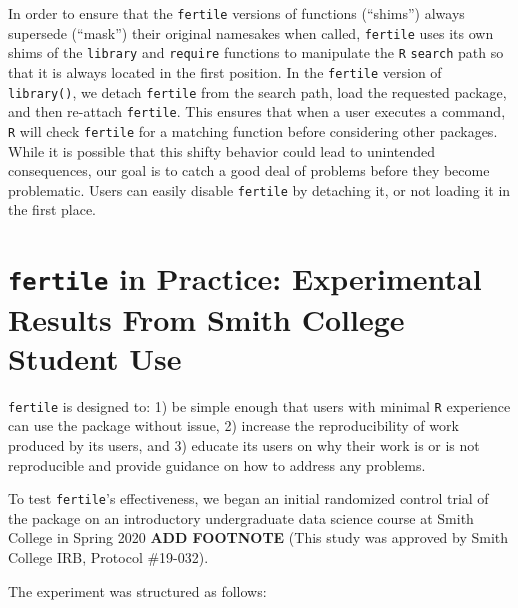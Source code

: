 \documentclass[12pt,twoside]{reedthesis}
\begin{document}
In order to ensure that the \texttt{fertile} versions of functions
(``shims'') always supersede (``mask'') their original namesakes when
called, \texttt{fertile} uses its own shims of the \texttt{library} and
\texttt{require} functions to manipulate the \texttt{R} \texttt{search}
path so that it is always located in the first position. In the
\texttt{fertile} version of \texttt{library()}, we detach
\texttt{fertile} from the search path, load the requested package, and
then re-attach \texttt{fertile}. This ensures that when a user executes
a command, \texttt{R} will check \texttt{fertile} for a matching
function before considering other packages. While it is possible that
this shifty behavior could lead to unintended consequences, our goal is
to catch a good deal of problems before they become problematic. Users
can easily disable \texttt{fertile} by detaching it, or not loading it
in the first place.

\section{\texorpdfstring{\texttt{fertile} in Practice: Experimental
Results From Smith College Student
Use}{fertile in Practice: Experimental Results From Smith College Student Use}}\label{fertile-in-practice-experimental-results-from-smith-college-student-use}

\texttt{fertile} is designed to: 1) be simple enough that users with
minimal \texttt{R} experience can use the package without issue, 2)
increase the reproducibility of work produced by its users, and 3)
educate its users on why their work is or is not reproducible and
provide guidance on how to address any problems.

To test \texttt{fertile}'s effectiveness, we began an initial randomized
control trial of the package on an introductory undergraduate data
science course at Smith College in Spring 2020 \textbf{ADD FOOTNOTE}
(This study was approved by Smith College IRB, Protocol \#19-032).

The experiment was structured as follows:
\end{document}
